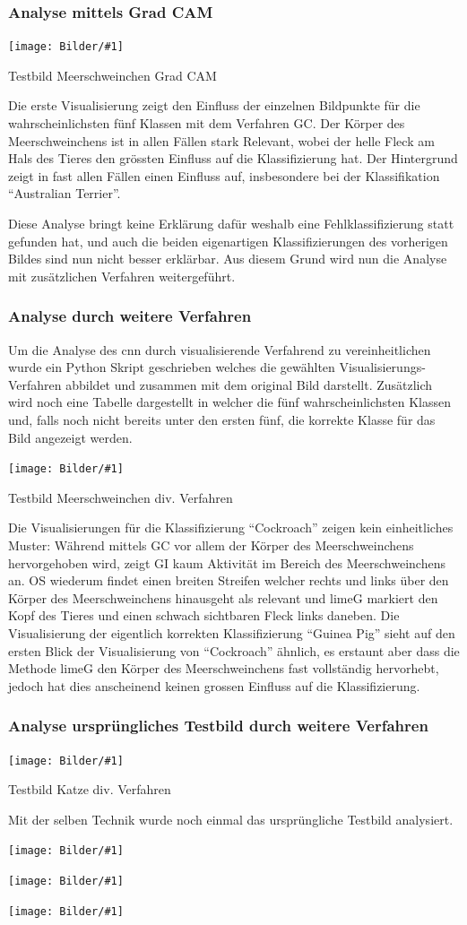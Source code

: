 \documentclass[
  12pt, %
  a4paper, %
  oneside, %
  openany, 
  numbers=noenddot, %
  BCOR=5mm, %
  parskip=half*, %
  thesis, %
]{bfhbook}
\newcommand{\imgText}[3]{
\begin{center}
    \begin{minipage}[t]{0.6\textwidth}
    		\vspace{0pt}
		\texttt{[image: Bilder/\#1]}
		\caption{#2}
	\end{minipage}\hfill
    \begin{minipage}[t]{0.4\textwidth}
    		\vspace{5pt}
  		#3
    \end{minipage}
\end{center}
}
\begin{document}
\subsubsection*{Analyse mittels Grad CAM}
\imgText{Oreo-Grad-Cam-Classes.png}{Testbild Meerschweinchen Grad CAM}{
Die erste Visualisierung zeigt den Einfluss der einzelnen Bildpunkte für die wahrscheinlichsten fünf Klassen mit dem Verfahren \Gls{GC}. Der Körper des Meerschweinchens ist in allen Fällen stark Relevant, wobei der helle Fleck am Hals des Tieres den grössten Einfluss auf die Klassifizierung hat. Der Hintergrund zeigt in fast allen Fällen einen Einfluss auf, insbesondere bei der Klassifikation ``Australian Terrier''.
}
Diese Analyse bringt keine Erklärung dafür weshalb eine Fehlklassifizierung statt gefunden hat, und auch die beiden eigenartigen Klassifizierungen des vorherigen Bildes sind nun nicht besser erklärbar. Aus diesem Grund wird nun die Analyse mit zusätzlichen Verfahren weitergeführt.

\subsubsection*{Analyse durch weitere Verfahren}
Um die Analyse des \Gls{cnn} durch visualisierende Verfahrend zu vereinheitlichen wurde ein Python Skript geschrieben welches die gewählten Visualisierungs-Verfahren abbildet und zusammen mit dem original Bild darstellt. Zusätzlich wird noch eine Tabelle dargestellt in welcher die fünf wahrscheinlichsten Klassen und, falls noch nicht bereits unter den ersten fünf, die korrekte Klasse für das Bild angezeigt werden.
\imgText{Oreo-Classification.png}{Testbild Meerschweinchen div. Verfahren}{
Die Visualisierungen für die Klassifizierung ``Cockroach''  zeigen kein einheitliches Muster: \break 
Während mittels \Gls{GC} vor allem der Körper des Meerschweinchens hervorgehoben wird, zeigt \Gls{GI} kaum Aktivität im Bereich des Meerschweinchens an. \break 
\Gls{OS} wiederum findet einen breiten Streifen welcher rechts und links über den Körper des Meerschweinchens hinausgeht als relevant und \Gls{limeG} markiert den Kopf des Tieres und einen schwach sichtbaren Fleck links daneben. \break
Die Visualisierung der eigentlich korrekten Klassifizierung ``Guinea Pig'' sieht auf den ersten Blick der Visualisierung von ``Cockroach'' ähnlich, es erstaunt aber dass die Methode \Gls{limeG} den Körper des Meerschweinchens fast vollständig hervorhebt, jedoch hat dies anscheinend keinen grossen Einfluss auf die Klassifizierung.
}

\subsubsection*{Analyse ursprüngliches Testbild durch weitere Verfahren}
\imgText{Mira-Classification.png}{Testbild Katze div. Verfahren}{
Mit der selben Technik wurde noch einmal das ursprüngliche Testbild analysiert.
}
\imgText{Mira-Classification-2-only-tabby.png}{}{}
\imgText{Merlin-Classification.png}{}{}
\imgText{Toilett-Tissue-Classification.png}{}{}
\end{document}
